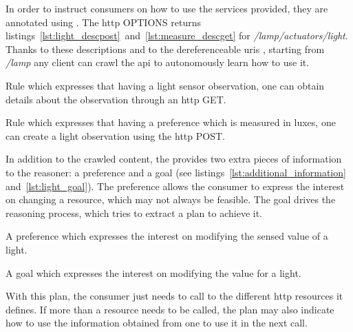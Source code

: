 In order to instruct consumers on how to use the services provided, they are annotated using \restdesc{}.
The \acs{http} OPTIONS returns listings~\ref{lst:light_descpost}~and~\ref{lst:measure_descget} for \emph{/lamp/actuators/light}.
Thanks to these descriptions and to the dereferenceable \acsp{uri} \citep{sauermann_cool_2008}, starting from \emph{/lamp} any client can crawl the \acs{api} to autonomously learn how to use it. %


\begin{listing}
  
  \caption{Rule which expresses that having a light sensor observation, one can obtain details about the observation through an \acs{http} GET.}
  \label{lst:measure_descget}
\end{listing}

\begin{listing}
  
  \caption{Rule which expresses that having a preference which is measured in luxes, one can create a light observation using the \acs{http} POST.}
  \label{lst:light_descpost}
\end{listing}


In addition to the crawled content, the \nodeConsRest{} provides two extra pieces of information to the reasoner: a preference and a goal (see listings~\ref{lst:additional_information} and~\ref{lst:light_goal}).
The preference allows the consumer to express the interest on changing a resource, which may not always be feasible.
The goal drives the reasoning process, which tries to extract a plan to achieve it.

\begin{listing}
  
  \caption{A preference which expresses the interest on modifying the sensed value of a light.}
  \label{lst:additional_information}
\end{listing}

\begin{listing}
  
  \caption{A goal which expresses the interest on modifying the value for a light.}
  \label{lst:light_goal}
\end{listing}

With this plan, the consumer just needs to call to the different \acs{http} resources it defines.
If more than a resource needs to be called, the plan may also indicate how to use the information obtained from one to use it in the next call.
